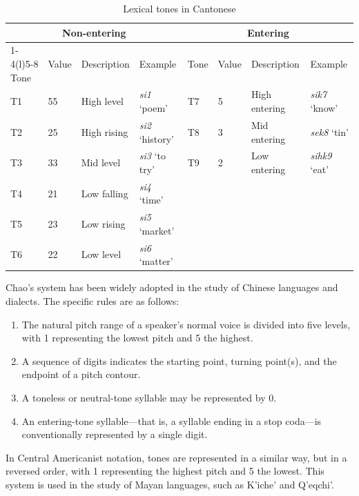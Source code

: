\begin{table}[ht]
\centering
\caption{Lexical tones in Cantonese}
\label{tab:cantonese-tones}

\begin{tabular}{llll@{\qquad}llll}
\toprule
\multicolumn{4}{c}{Non-entering} &
\multicolumn{4}{c}{Entering} \\
\cmidrule(r){1-4}\cmidrule(l){5-8}
Tone & Value & Description & Example &
Tone & Value & Description & Example \\
\midrule
T1 & 55 & High level   & \textit{si1} `poem' &
T7 & 5  & High entering & \textit{sik7} `know' \\

T2 & 25 & High rising  & \textit{si2} `history' &
T8 & 3  & Mid entering  & \textit{sek8} `tin' \\

T3 & 33 & Mid level    & \textit{si3} `to try' &
T9 & 2  & Low entering  & \textit{sihk9} `eat' \\

T4 & 21 & Low falling  & \textit{si4} `time' &
   &    &               & \\
T5 & 23 & Low rising   & \textit{si5} `market' &
   &    &               & \\

T6 & 22 & Low level    & \textit{si6} `matter' &
   &    &               & \\
\bottomrule
\end{tabular}
\end{table}
 
Chao's system has been widely adopted in the study of Chinese languages and dialects.
The specific rules are as follows:
\begin{enumerate}[itemsep=1em, parsep=-1em]
	\item The natural pitch range of a speaker’s normal voice is divided into five levels, with 1 representing the lowest pitch and 5 the highest.
	\item A sequence of digits indicates the starting point, turning point(s), and the endpoint of a pitch contour. 
	\item A toneless or neutral-tone syllable may be represented by 0.
	\item An entering-tone syllable—that is, a syllable ending in a stop coda—is conventionally represented by a single digit.
\end{enumerate}

In Central Americanist notation, tones are represented in a similar way, but in a 
reversed order, with 1 representing the highest pitch and 5 the lowest. This system 
is used in the study of Mayan languages, such as K’iche’ and Q’eqchi’. 

